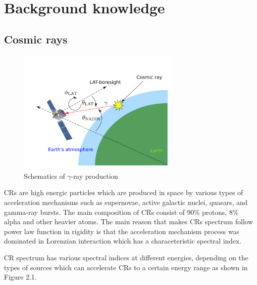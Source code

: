 \chapter{Background knowledge}

\section{Cosmic rays}
\begin{figure}[h!]
  \centering
    \includegraphics[width=0.7\textwidth]{img/gamma_production_schematic}
    \caption{Schematics of $\gamma$-ray production}
\end{figure}


\acl{CR}s are high energic particles which are produced in space by various types of acceleration mechanisms such as  supernovae, active galactic nuclei, quasars, and gamma-ray bursts. The main composition of CRs consist of 90\% protons, 8\% alpha and other heavier atoms.
The main reason that makes CRs spectrum follow power law function in rigidity is that the acceleration mechanism process was dominated in Lorenzian interaction which has a characeteristic spectral index.
\par CR spectrum has various spectral indices at different energies, depending on the types of sources which can accelerate CRs to a certain energy range as shown in Figure 2.1\cite{Swordy2001}.


